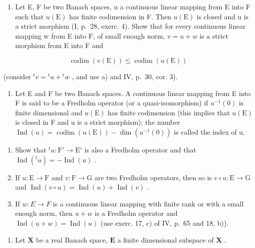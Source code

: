 \begin{enumerate}
\def\labelenumi{\alph{enumi})}
\setcounter{enumi}{1}
\tightlist
\item
  Let E, F be two Banach spaces, u a continuous linear mapping from E into F such that \(u(\mathrm{E})\) has finite codimension in F. Then \(u(\mathrm{E})\) is closed and u is a strict morphism (I, p.~28, exerc. 4). Show that for every continuous linear mapping w from E into F, of small enough norm, \(v = u + w\) is a strict morphism from E into F and
\end{enumerate}

\[
\operatorname{codim} (v (\mathrm{E})) \leqslant \operatorname{codim} (u (\mathrm{E}))
\]

(consider \({}^t v = {}^t u + {}^t w\) , and use a) and IV, p.~30, cor. 3).

\begin{enumerate}
\def\labelenumi{\arabic{enumi})}
\setcounter{enumi}{20}
\tightlist
\item
  Let E and F be two Banach spaces. A continuous linear mapping from E into F is said to be a Fredholm operator (or a quasi-isomorphism) if \(u^{-1}(0)\) is finite dimensional and \(u(\mathrm{E})\) has finite codimension (this implies that \(u(\mathrm{E})\) is closed in F and u is a strict morphism); the number \(\operatorname{Ind}(u) = \operatorname{codim}(u(\mathrm{E})) - \dim(u^{-1}(0))\) is called the index of u.
\end{enumerate}

\begin{enumerate}
\def\labelenumi{\alph{enumi})}
\item
  Show that \({}^t u: \mathrm{F}' \to \mathrm{E}'\) is also a Fredholm operator and that \(\operatorname{Ind}({}^t u) = -\operatorname{Ind}(u)\) .
\item
  If \(u: \mathrm{E} \to \mathrm{F}\) and \(v: \mathrm{F} \to \mathrm{G}\) are two Fredholm operators, then so is \(v \circ u: \mathrm{E} \to \mathrm{G}\) and \(\operatorname{Ind}(v \circ u) = \operatorname{Ind}(u) + \operatorname{Ind}(v)\) .
\item
  If \(w: E \to F\) is a continuous linear mapping with finite rank or with a small enough norm, then \(u + w\) is a Fredholm operator and \(\operatorname{Ind}(u + w) = \operatorname{Ind}(u)\) (use exerc. 17, c) of IV, p.~65 and 18, b)).
\end{enumerate}

\begin{enumerate}
\def\labelenumi{\arabic{enumi})}
\setcounter{enumi}{21}
\tightlist
\item
  Let \(\mathbf{X}\) be a real Banach space, \(\mathbf{E}\) a finite dimensional subspace of \(\mathbf{X}\) .
\end{enumerate}

